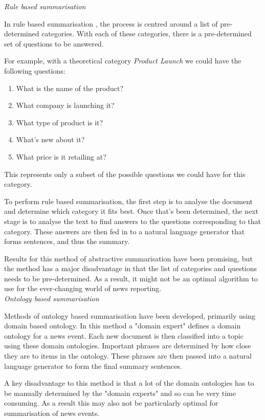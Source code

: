 \documentclass[12pt]{article}
\begin{document}
\emph{Rule based summarisation}

In rule based summarisation \cite{ruleBasedSummarisation}, the process is centred around a list of pre-determined categories. With each of these categories, there is a pre-determined set of questions to be answered. 

For example, with a theoretical category \emph{Product Launch} we could have the following questions:

\begin{enumerate}
	\item What is the name of the product?
	\item What company is launching it?
	\item What type of product is it?
	\item What's new about it?
	\item What price is it retailing at?
\end{enumerate}

This represents only a subset of the possible questions we could have for this category.

To perform rule based summarisation, the first step is to analyse the document and determine which category it fits best. Once that's been determined, the next stage is to analyse the text to find answers to the questions corresponding to that category. These answers are then fed in to a natural language generator that forms sentences, and thus the summary.

Results for this method of abstractive summarisation have been promising, but the method has a major disadvantage in that the list of categories and questions needs to be pre-determined. As a result, it might not be an optimal algorithm to use for the ever-changing world of news reporting. \\

\emph{Ontology based summarisation}

Methods of ontology based summarisation have been developed, primarily using domain based ontology. In this method a "domain expert" defines a domain ontology for a news event. Each new document is then classified into a topic using these domain ontologies. Important phrases are determined by how close they are to items in the ontology. These phrases are then passed into a natural language generator to form the final summary sentences.

A key disadvantage to this method is that a lot of the domain ontologies has to be manually determined by the "domain experts" and so can be very time consuming. As a result this may also not be particularly optimal for summarisation of news events. \\
\end{document}
